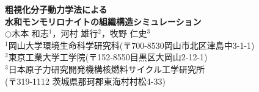 ﻿\documentclass[11pt,a4j]{jarticle}
\newlength{\minitwocolumn}
\begin{document}
\newcommand{\fat}[1]{\mbox{\boldmath $#1$}}
\newcommand{\D}{\partial}
\newcommand{\w}{\omega}
\newcommand{\ga}{\alpha}
\newcommand{\gb}{\beta}
\newcommand{\gx}{\xi}
\newcommand{\gz}{\zeta}
\newcommand{\vhat}[1]{\hat{\fat{#1}}}
\newcommand{\spc}{\vspace{0.7\baselineskip}}
\newcommand{\halfspc}{\vspace{0.3\baselineskip}}

\newcommand{\twofig}[2]
 {
   \begin{figure}[h]
     \begin{minipage}[t]{\minitwocolumn}
         \begin{center}   #1
         \end{center}
     \end{minipage}
         \hspace{\columnsep}
     \begin{minipage}[t]{\minitwocolumn}
         \begin{center} #2
         \end{center}
     \end{minipage}
   \end{figure}
 }
\begin{center}
{\LARGE \bf 
粗視化分子動力学法による\\水和モンモリロナイトの組織構造シミュレーション\\
} 
 $\bigcirc$木本 和志$^1$，河村 雄行$^2$，牧野 仁史$^3$\\
$^1$岡山大学環境生命科学研究科(〒700-8530岡山市北区津島中3-1-1)\\
$^2$東京工業大学工学院(〒152-8550目黒区大岡山2-12-1)\\
$^3$日本原子力研究開発機構核燃料サイクル工学研究所\\
(〒319-1112 茨城県那珂郡東海村村松4-33)
\end{center}
\end{document}
